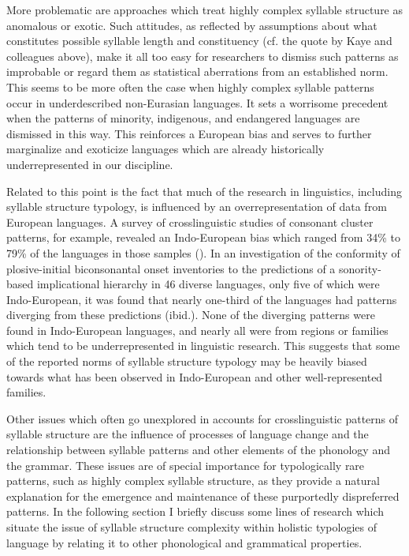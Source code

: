   More problematic are approaches which treat highly complex syllable structure as anomalous or exotic. Such attitudes, as reflected by assumptions about what constitutes possible syllable length and constituency (cf. the quote by Kaye and colleagues above), make it all too easy for researchers to dismiss such patterns as improbable or regard them as statistical aberrations from an established norm. This seems to be more often the case when highly complex syllable patterns occur in underdescribed non-Eurasian languages. It sets a worrisome precedent when the patterns of minority, indigenous, and endangered languages are dismissed in this way. This reinforces a European bias and serves to further marginalize and exoticize languages which are already historically underrepresented in our discipline.

  Related to this point is the fact that much of the research in linguistics, including syllable structure typology, is influenced by an overrepresentation of data from European languages. A survey of crosslinguistic studies of consonant cluster patterns, for example, revealed an Indo-European bias which ranged from 34\% \citep{Morelli1999} to 79\% \citep{Vennemann2012} of the languages in those samples (\citealt{EasterdayNapoleãodeSouza2015}). In an investigation of the conformity of plosive-initial biconsonantal onset inventories to the predictions of a sonority-based implicational hierarchy in 46 diverse languages, only five of which were Indo-European, it was found that nearly one-third of the languages had patterns diverging from these predictions (ibid.). None of the diverging patterns were found in Indo-European languages, and nearly all were from regions or families which tend to be underrepresented in linguistic research. This suggests that some of the reported norms of syllable structure typology may be heavily biased towards what has been observed in Indo-European and other well-represented families.

  Other issues which often go unexplored in accounts for crosslinguistic patterns of syllable structure are the influence of processes of language change and the relationship between syllable patterns and other elements of the phonology and the grammar. These issues are of special importance for typologically rare patterns, such as highly complex syllable structure, as they provide a natural explanation for the emergence and maintenance of these purportedly dispreferred patterns. In the following section I briefly discuss some lines of research which situate the issue of syllable structure complexity within holistic typologies of language by relating it to other phonological and grammatical properties.


